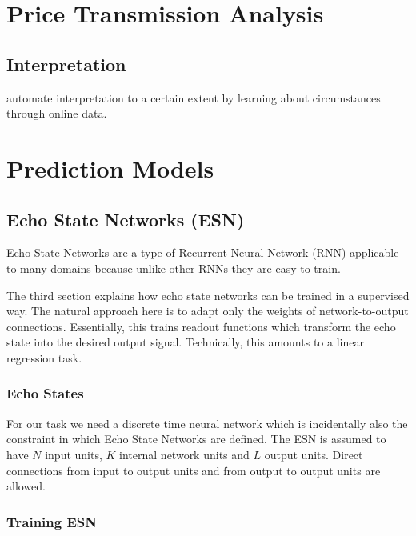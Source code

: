 \section*{Price Transmission Analysis}

\subsection*{Interpretation}
automate interpretation to a certain extent by learning about circumstances through online data.

\section*{Prediction Models}

\subsection*{Echo State Networks (ESN)}
Echo State Networks are a type of Recurrent Neural Network (RNN) applicable to many domains because unlike other RNNs they are easy to train.

\cite{jaeger_echo_state_RNN}
The third section explains how echo state networks can be trained in a
supervised way. The natural approach here is to adapt only the weights
of network-to-output connections. Essentially, this trains readout functions
which transform the echo state into the desired output signal. Technically,
this amounts to a linear regression task.

\subsubsection*{Echo States}
For our task we need a discrete time neural network which is incidentally also the constraint in which Echo State Networks are defined. The ESN is assumed to have $N$ input units, $K$ internal network units and $L$ output units. Direct connections from input to output units and from output to output units are allowed.

\subsubsection*{Training ESN}

